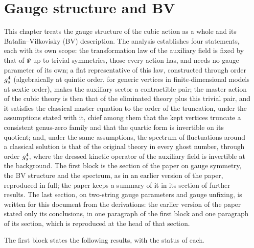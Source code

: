 \section{Gauge structure and BV}
\label{ch:gauge-bv}

This chapter treats the gauge structure of the cubic action as a whole and its Batalin--Vilkovisky (BV) description.
The analysis establishes four statements, each with its own scope: the transformation law of the auxiliary field is fixed by that of $\Psi$ up to trivial symmetries, those every action has, and needs no gauge parameter of its own; a flat representative of this law, constructed through order $g_s^4$ (algebraically at quintic order, for generic vertices in finite-dimensional models at sextic order), makes the auxiliary sector a contractible pair; the master action of the cubic theory is then that of the eliminated theory plus this trivial pair, and it satisfies the classical master equation to the order of the truncation, under the assumptions stated with it, chief among them that the kept vertices truncate a consistent genus-zero family and that the quartic form is invertible on its quotient; and, under the same assumptions, the spectrum of fluctuations around a classical solution is that of the original theory in every ghost number, through order $g_s^4$, where the dressed kinetic operator of the auxiliary field is invertible at the background.
The first block is the section of the paper on gauge symmetry, the BV structure and the spectrum, as in an earlier version of the paper, reproduced in full; the paper keeps a summary of it in its section of further results.
The last section, on two-string gauge parameters and gauge unfixing, is written for this document from the derivations: the earlier version of the paper stated only its conclusions, in one paragraph of the first block and one paragraph of its \IBL{} section, which is reproduced at the head of that section.

The first block states the following results, with the status of each.

